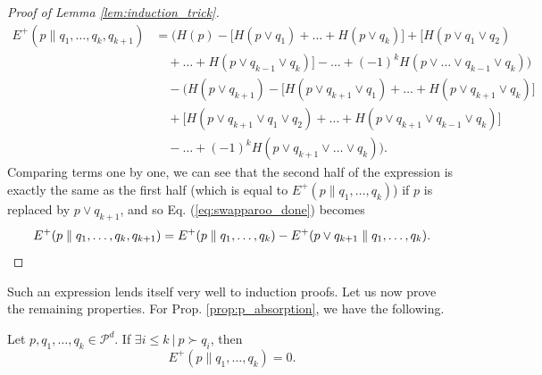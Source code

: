 \begin{proof}[Proof of Lemma \ref{lem:induction_trick}]
    \begin{align}
        E^+(p \parallel q_1, \dots, q_k, q_{k+1}) &= \Big(H(p) - \big[H(p \vee q_1) + \dots + H(p \vee q_k)\big] + \big[H(p \vee q_1 \vee q_2)\nonumber \\
                                                  &\quad + \dots + H(p \vee q_{k-1} \vee q_k)\big] - \dots + (-1)^{k} H(p \vee \dots \vee q_{k-1} \vee q_{k})\Big) \nonumber \\
                                                  &\quad - \Big(H(p \vee q_{k+1}) - \big[H(p \vee q_{k+1} \vee q_1) + \dots + H(p \vee q_{k+1} \vee q_k)\big]\nonumber \\
                                                  &\quad + \big[H(p \vee q_{k+1} \vee q_1 \vee q_2) + \dots + H(p \vee q_{k+1} \vee q_{k-1} \vee q_k)\big]\nonumber \\
                                                  &\quad - \dots + (-1)^{k} H(p \vee q_{k+1} \vee \dots \vee q_k)\Big).  \label{eq:swapparoo_done}
    \end{align}
    Comparing terms one by one, we can see that the second half of the expression is exactly the same as the first half (which is equal to $E^+(p \parallel q_1, \dots, q_k)$) if $p$ is replaced by $p \vee q_{k+1}$, and so Eq. (\ref{eq:swapparoo_done}) becomes
    \begin{equation}
        E^+(p \parallel q_1, \dots, q_k, q_{k+1}) = E^+(p \parallel q_1, \dots, q_k) - E^+(p \vee q_{k+1} \parallel q_1, \dots, q_k). \qedhere
    \end{equation}
\end{proof}

Such an expression lends itself very well to induction proofs. Let us now prove the remaining properties. For Prop. \ref{prop:p_absorption}, we have the following.

\begin{appendix_lemma}
    Let $p, q_1, \dots, q_k \in \mathcal{P}^d$. If $\exists i \leq k \: | \: p \succ q_i$, then
    \begin{equation}
        E^+(p \parallel q_1, \dots, q_k) = 0.
    \end{equation}
\end{appendix_lemma}

